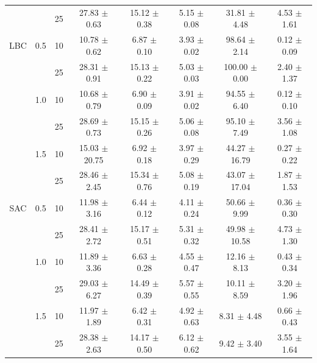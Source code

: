 \documentclass[manuscript,screen,review]{acmart}
\begin{document}
\begin{table}[ht]
{\begin{tabular}{cccccccc}
    &     & 25 &  27.83 $\pm$    0.63 &   15.12 $\pm$   0.38 &           5.15 $\pm$   0.08 &    31.81 $\pm$    4.48 &                    4.53 $\pm$   1.61 \\
LBC & 0.5 & 10 &  10.78 $\pm$    0.62 &    6.87 $\pm$   0.10 &           3.93 $\pm$   0.02 &    98.64 $\pm$    2.14 &                    0.12 $\pm$   0.09 \\
    &     & 25 &  28.31 $\pm$    0.91 &   15.13 $\pm$   0.22 &           5.03 $\pm$   0.03 &   100.00 $\pm$    0.00 &                    2.40 $\pm$   1.37 \\
    & 1.0 & 10 &  10.68 $\pm$    0.79 &    6.90 $\pm$   0.09 &           3.91 $\pm$   0.02 &    94.55 $\pm$    6.40 &                    0.12 $\pm$   0.10 \\
    &     & 25 &  28.69 $\pm$    0.73 &   15.15 $\pm$   0.26 &           5.06 $\pm$   0.08 &    95.10 $\pm$    7.49 &                    3.56 $\pm$   1.08 \\
    & 1.5 & 10 &  15.03 $\pm$   20.75 &    6.92 $\pm$   0.18 &           3.97 $\pm$   0.29 &    44.27 $\pm$   16.79 &                    0.27 $\pm$   0.22 \\
    &     & 25 &  28.46 $\pm$    2.45 &   15.34 $\pm$   0.76 &           5.08 $\pm$   0.19 &    43.07 $\pm$   17.04 &                    1.87 $\pm$   1.53 \\
SAC & 0.5 & 10 &  11.98 $\pm$    3.16 &    6.44 $\pm$   0.12 &           4.11 $\pm$   0.24 &    50.66 $\pm$    9.99 &                    0.36 $\pm$   0.30 \\
    &     & 25 &  28.41 $\pm$    2.72 &   15.17 $\pm$   0.51 &           5.31 $\pm$   0.32 &    49.98 $\pm$   10.58 &                    4.73 $\pm$   1.30 \\
    & 1.0 & 10 &  11.89 $\pm$    3.36 &    6.63 $\pm$   0.28 &           4.55 $\pm$   0.47 &    12.16 $\pm$    8.13 &                    0.43 $\pm$   0.34 \\
    &     & 25 &  29.03 $\pm$    6.27 &   14.49 $\pm$   0.39 &           5.57 $\pm$   0.55 &    10.11 $\pm$    8.59 &                    3.20 $\pm$   1.96 \\
    & 1.5 & 10 &  11.97 $\pm$    1.89 &    6.42 $\pm$   0.31 &           4.92 $\pm$   0.63 &     8.31 $\pm$    4.48 &                    0.66 $\pm$   0.43 \\
    &     & 25 &  28.38 $\pm$    2.63 &   14.17 $\pm$   0.50 &           6.12 $\pm$   0.62 &     9.42 $\pm$    3.40 &                    3.55 $\pm$   1.64 \\



\end{tabular}}
\end{table}
\end{document}
